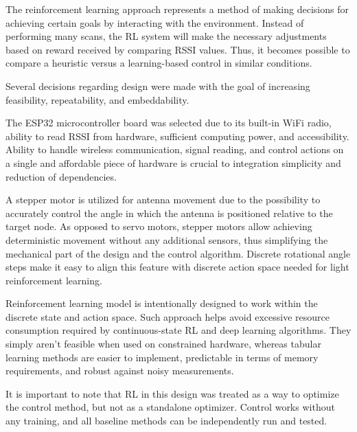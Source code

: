 The reinforcement learning approach represents a method of making decisions for achieving certain goals by interacting with the environment. Instead of performing many scans, the RL system will make the necessary adjustments based on reward received by comparing RSSI values. Thus, it becomes possible to compare a heuristic versus a learning-based control in similar conditions.

Several decisions regarding design were made with the goal of increasing feasibility, repeatability, and embeddability.

The ESP32 microcontroller board was selected due to its built-in WiFi radio, ability to read RSSI from hardware, sufficient computing power, and accessibility. Ability to handle wireless communication, signal reading, and control actions on a single and affordable piece of hardware is crucial to integration simplicity and reduction of dependencies.

A stepper motor is utilized for antenna movement due to the possibility to accurately control the angle in which the antenna is positioned relative to the target node. As opposed to servo motors, stepper motors allow achieving deterministic movement without any additional sensors, thus simplifying the mechanical part of the design and the control algorithm. Discrete rotational angle steps make it easy to align this feature with discrete action space needed for light reinforcement learning.

Reinforcement learning model is intentionally designed to work within the discrete state and action space. Such approach helps avoid excessive resource consumption required by continuous-state RL and deep learning algorithms. They simply aren't feasible when used on constrained hardware, whereas tabular learning methods are easier to implement, predictable in terms of memory requirements, and robust against noisy measurements.

It is important to note that RL in this design was treated as a way to optimize the control method, but not as a standalone optimizer. Control works without any training, and all baseline methods can be independently run and tested.